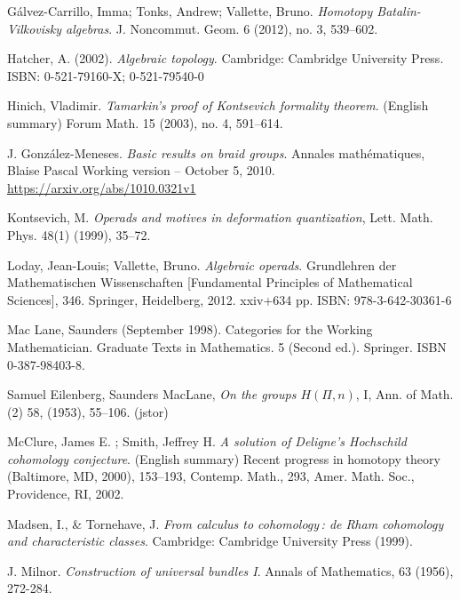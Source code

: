 \documentclass[TFM.tex]{subfiles}
\begin{document}
\begin{thebibliography}{}
  Gálvez-Carrillo, Imma; Tonks, Andrew; Vallette, Bruno. \emph{Homotopy Batalin-Vilkovisky algebras}. J. Noncommut. Geom. 6 (2012), no. 3, 539–602.


 Hatcher, A. (2002). \emph{Algebraic topology}. Cambridge: Cambridge University Press. ISBN: 0-521-79160-X; 0-521-79540-0 


 Hinich, Vladimir. \emph{Tamarkin's proof of Kontsevich formality theorem}. (English summary) 
Forum Math. 15 (2003), no. 4, 591–614. 


 J. González-Meneses. \emph{Basic results on braid groups}. Annales mathématiques, Blaise Pascal Working version – October 5, 2010. \url{https://arxiv.org/abs/1010.0321v1}


 Kontsevich, M. \emph{Operads and motives in deformation quantization}, Lett. Math. Phys.
48(1) (1999), 35–72.


 Loday, Jean-Louis; Vallette, Bruno. \emph{Algebraic operads}. Grundlehren der Mathematischen Wissenschaften [Fundamental Principles of Mathematical Sciences], 346. Springer, Heidelberg, 2012. xxiv+634 pp. ISBN: 978-3-642-30361-6

 Mac Lane, Saunders (September 1998). Categories for the Working Mathematician. Graduate Texts in Mathematics. 5 (Second ed.). Springer. ISBN 0-387-98403-8.

 Samuel Eilenberg, Saunders MacLane, \emph{On the groups $H(Π,n)$}, I, Ann. of Math. (2) 58, (1953), 55–106. (jstor) %

 McClure, James E. ; Smith, Jeffrey H.
\emph{A solution of Deligne's Hochschild cohomology conjecture}. (English summary) Recent progress in homotopy theory (Baltimore, MD, 2000), 153–193, 
Contemp. Math., 293, Amer. Math. Soc., Providence, RI, 2002. 

 Madsen, I., \& Tornehave, J. \emph{From calculus to cohomology : de Rham cohomology and characteristic classes}. Cambridge: Cambridge University Press (1999).

 J. Milnor. \emph{Construction of universal bundles I}. Annals of Mathematics, 63 (1956), 272-284. %



\end{thebibliography}
\end{document}
